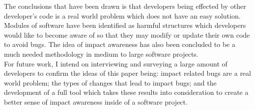 \documentclass[conference]{IEEEtran}
\begin{document}
The conclusions that have been drawn is that developers being effected by other developer's
code is a real world problem which does not have an easy solution. Modules of software
have been identified as harmful structures which developers would like to become
aware of so that they may modify or update their own code to avoid bugs. The idea of
impact awareness has also been concluded to be a much needed methodology in 
medium to large software projects.\\

For future work, I intend on interviewing and surveying a large amount of developers
to confirm the ideas of this paper being: impact related bugs are a real world problem; the
types of changes that lead to impact bugs; and the development of a full tool which takes
these results into consideration to create a better sense of impact awareness inside of
a software project.





\end{document}
